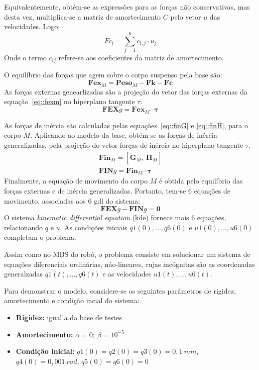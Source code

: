 Equivalentemente, obtém-se as expressões para as forças não conservativas, mas
desta vez, multiplica-se a matriz de amortecimento $C$ pelo vetor $u$ das
velocidades. Logo:
%
\begin{equation} \label{eq::fci}
	Fc_i = \sum_{j=1}^{6} c_{i,j} \cdot u_j
\end{equation}
%
Onde o termo $c_{ij}$ refere-se aos coeficientes da matriz de amortecimento.

O equilíbrio das forças que agem sobre o corpo suspenso pela base são:
%
\begin{equation} \label{eq::fexm}
	\mathbf{Fex}_M = \mathbf{Peso}_M - \mathbf{Fk} - \mathbf{Fc}
\end{equation}
%
As forças externas genearlizadas são a projeção do vetor das forças externas da
equação~\ref{eq::fexm} no hiperplano tangente $\tau$.
%
\begin{equation}
	\mathbf{FEX}g = \mathbf{Fex}_M \cdot \boldsymbol{\tau}
\end{equation}
%

As forças de inércia são calculadas pelas equações~\ref{eq::finG} e
\ref{eq::finH}, para o corpo $M$. Aplicando ao modelo da base, obtém-se as
forças de inércia generalizadas, pela projeção do vetor forças de inércia no
hiperplano tangente $\tau$.
%
\begin{gather}
	\mathbf{Fin}_M = [\dot{\mathbf{G}}_{M},~ \dot{\mathbf{H}}_{M}] \\
	\mathbf{FIN}g = \mathbf{Fin}_M \cdot \boldsymbol{\tau}
\end{gather}
%
Finalmente, a equação de movimento do corpo $M$ é obtida pelo equilíbrio das
forças externas e de inércia generalizadas. Portanto, tem-se 6 equações de
movimento, associadas aos 6 gdl do sistema:
%
\begin{equation}
	\mathbf{FEX}g - \mathbf{FIN}g = \mathbf{0}
\end{equation}
%
O sistema \textit{kinematic differential equation} (kde) fornece mais 6
equações, relacionando $q$ e $u$. As condições iniciais $q1(0),\ldots,q6(0)$ e
$u1(0),\ldots,u6(0)$ completam o problema.

Assim como no MBS do robô, o problema consiste em solucionar um sistema de
equações diferenciais ordinárias, não-lineares, cujas incógnitas são as
coordenadas generalzadas $q1(t),\ldots,q6(t)$ e as velocidades
$u1(t),\ldots,u6(t)$. 

Para demonstrar o modelo, considere-se os seguintes parâmetros de rigidez,
amortecimento e condição incial do sistema:
%
\begin{itemize}
  \item{\textbf{Rigidez:} igual a da base de testes}
  \item{\textbf{Amortecimento:} $\alpha = 0;~ \beta = 10^{-5}$}
  \item{\textbf{Condição inicial:} $q1(0) = q2(0) = q3(0) = 0,1~mm$, $q4(0) =
  0,001~rad$, $q5(0) = q6(0) = 0$}
\end{itemize}
%


